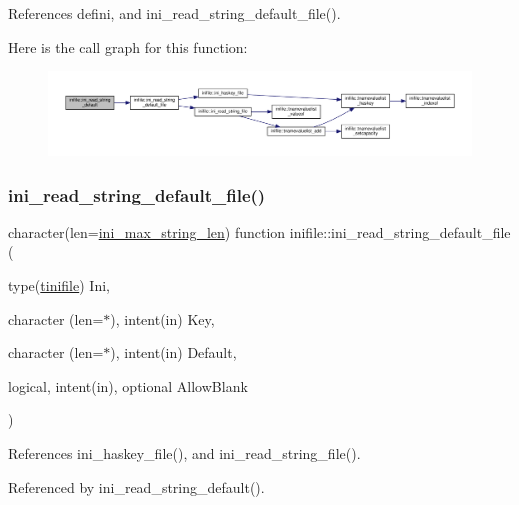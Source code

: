 References defini, and ini\+\_\+read\+\_\+string\+\_\+default\+\_\+file().

Here is the call graph for this function\+:
\nopagebreak
\begin{figure}[H]
\begin{center}
\leavevmode
\includegraphics[width=350pt]{namespaceinifile_aa7ae8cf26934154dd70639ba1ed9d541_cgraph}
\end{center}
\end{figure}
\mbox{\label{namespaceinifile_a7af43d0285b9f48d8082252153920a68}} 
\subsubsection{\texorpdfstring{ini\+\_\+read\+\_\+string\+\_\+default\+\_\+file()}{ini\_read\_string\_default\_file()}}
{\footnotesize\ttfamily character(len=\mbox{\hyperlink{namespaceinifile_a32faebf83b580d14b5af965dcb4eebfd}{ini\+\_\+max\+\_\+string\+\_\+len}}) function inifile\+::ini\+\_\+read\+\_\+string\+\_\+default\+\_\+file (\begin{DoxyParamCaption}\item[{type(\mbox{\hyperlink{structinifile_1_1tinifile}{tinifile}})}]{Ini,  }\item[{character (len=$\ast$), intent(in)}]{Key,  }\item[{character (len=$\ast$), intent(in)}]{Default,  }\item[{logical, intent(in), optional}]{Allow\+Blank }\end{DoxyParamCaption})}



References ini\+\_\+haskey\+\_\+file(), and ini\+\_\+read\+\_\+string\+\_\+file().



Referenced by ini\+\_\+read\+\_\+string\+\_\+default().

